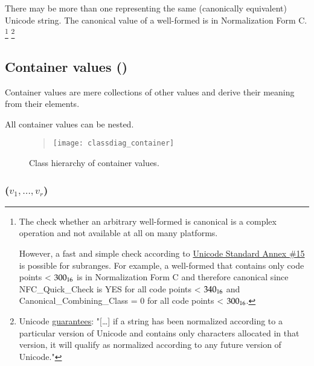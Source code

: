 There may be more than one \DborUtfEightStringValue{} representing the same (canonically equivalent) Unicode string.
The canonical value of a well-formed \DborUtfEightStringValue{} is in Normalization Form C.%
\footnote{
    The check whether an arbitrary well-formed \DborUtfEightStringValue{} is canonical
    is a complex operation and not available at all on many platforms.

    However, a fast and simple check according to
    \href{https://unicode.org/reports/tr15/\#Detecting_Normalization_Forms}{Unicode Standard Annex \#15}
    is possible for subranges.
    For example, a well-formed \DborUtfEightStringValue{} that contains only code points < $\mathrm{300}_{16}$ is
    in Normalization Form C and therefore canonical
    since NFC\_Quick\_Check is YES for all code points < $\mathrm{340}_{16}$ and Canonical\_Combining\_Class = 0
    for all code points < $\mathrm{300}_{16}$.
}%
\footnote{%
  Unicode \href{https://unicode.org/reports/tr15/\#Stability_of_Normalized_Forms}{guarantees}:
  "[\dots] if a string has been normalized according to a particular version of Unicode and contains only
  characters allocated in that version, it will qualify as normalized according to any future version of Unicode."
}


\subsection{Container values (\DborContainerValue)}
\label{sec:containervalues}
\hypertarget{sec:def:ContainerValue}{}

Container values are mere collections of other values and derive their meaning from their elements.

All container values can be nested.

\begin{figure}[H]
    \begin{quote}
        \noindent
        \texttt{[image: classdiag\_container]}%
        \caption{Class hierarchy of container values.}
        \label{fig:class:ContainerValue}
    \end{quote}
\end{figure}


\subsubsection{\DborSequenceValue(\texorpdfstring{$v_1, \ldots, v_r$}{v1, ...m vr})}
\hypertarget{sec:def:SequenceValue}{}

